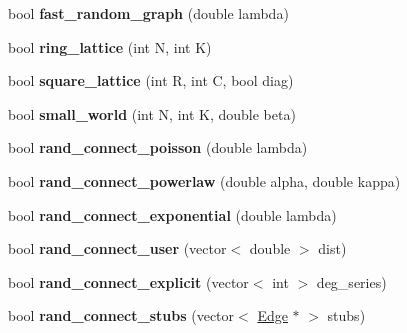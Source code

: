 \begin{DoxyCompactItemize}
\item 
\hypertarget{classNetwork_ad43dcfdc9ae6eceba263345fcf89a8d2}{}bool {\bfseries fast\+\_\+random\+\_\+graph} (double lambda)\label{classNetwork_ad43dcfdc9ae6eceba263345fcf89a8d2}

\item 
\hypertarget{classNetwork_a669fa9b5563bfffafc0fa8e9a48eb867}{}bool {\bfseries ring\+\_\+lattice} (int N, int K)\label{classNetwork_a669fa9b5563bfffafc0fa8e9a48eb867}

\item 
\hypertarget{classNetwork_a04933d68710bb79fec7bd8e10ec19f9d}{}bool {\bfseries square\+\_\+lattice} (int R, int C, bool diag)\label{classNetwork_a04933d68710bb79fec7bd8e10ec19f9d}

\item 
\hypertarget{classNetwork_a29c5d2dd1efbc9f40c3a0e318e49036c}{}bool {\bfseries small\+\_\+world} (int N, int K, double beta)\label{classNetwork_a29c5d2dd1efbc9f40c3a0e318e49036c}

\item 
\hypertarget{classNetwork_abd6b9fe591b882fc716738fb612d89fa}{}bool {\bfseries rand\+\_\+connect\+\_\+poisson} (double lambda)\label{classNetwork_abd6b9fe591b882fc716738fb612d89fa}

\item 
\hypertarget{classNetwork_a414dde2a6bcd5f9cb45e5cab6452c852}{}bool {\bfseries rand\+\_\+connect\+\_\+powerlaw} (double alpha, double kappa)\label{classNetwork_a414dde2a6bcd5f9cb45e5cab6452c852}

\item 
\hypertarget{classNetwork_a068af8f9da7939151dbeedbef35af9d0}{}bool {\bfseries rand\+\_\+connect\+\_\+exponential} (double lambda)\label{classNetwork_a068af8f9da7939151dbeedbef35af9d0}

\item 
\hypertarget{classNetwork_af0dc0df3f919b35d6c5586c8cbc71634}{}bool {\bfseries rand\+\_\+connect\+\_\+user} (vector$<$ double $>$ dist)\label{classNetwork_af0dc0df3f919b35d6c5586c8cbc71634}

\item 
\hypertarget{classNetwork_a0ecaab9f51f811cdc1071b66d3e358b6}{}bool {\bfseries rand\+\_\+connect\+\_\+explicit} (vector$<$ int $>$ deg\+\_\+series)\label{classNetwork_a0ecaab9f51f811cdc1071b66d3e358b6}

\item 
\hypertarget{classNetwork_a3769c229ac52fb7c7aff373747a002b8}{}bool {\bfseries rand\+\_\+connect\+\_\+stubs} (vector$<$ \hyperlink{classEdge}{Edge} $\ast$ $>$ stubs)\label{classNetwork_a3769c229ac52fb7c7aff373747a002b8}


\end{DoxyCompactItemize}
